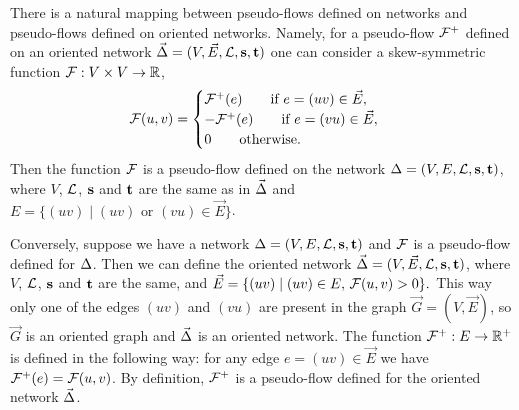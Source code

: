 \documentclass[12pt,oneside,a4paper]{amsart}
\begin{document}
      \begin{remark}
        There is a natural mapping between pseudo-flows defined on networks and pseudo-flows defined on oriented networks.
          Namely, for a pseudo-flow $\mathcal{{F}^{+}}$ defined on an oriented network $\vec{\Delta} = (V, \vec{E}, \mathcal{L}, \mathbf{s}, \mathbf{t})$
          one can consider a skew-symmetric function
          $\mathcal{F}: V \times V \to \mathbb{R}$,
        \begin{align*}
          \mathcal{F}(u, v)=
          \begin{cases}
            \mathcal{{F}^{+}}(e) \qquad \text{if } e = (uv) \in \vec{E},\\
            -\mathcal{{F}^{+}}(e) \qquad \text{if } e = (vu) \in \vec{E}, \\
            0 \qquad \text{otherwise}.
          \end{cases}
        \end{align*}
          Then the function $\mathcal{F}$ is a pseudo-flow defined on the network $\Delta = (V, E, \mathcal{L}, \mathbf{s}, \mathbf{t})$, where $V$, $\mathcal{L}$, $\mathbf{s}$ and $\mathbf{t}$ are the same
          as in $\vec{\Delta}$ and $E = \{(uv) \mid (uv) \text{ or } (vu) \in \vec{E}\}$.

        Conversely, suppose we have a network $\Delta = (V, E, \mathcal{L}, \mathbf{s}, \mathbf{t})$ and $\mathcal{F}$ is a pseudo-flow defined
          for $\Delta$.
        Then we can define the oriented network $\vec{\Delta} = (V, \vec{E}, \mathcal{L}, \mathbf{s}, \mathbf{t})$, where $V$, $\mathcal{L}$, $\mathbf{s}$ and $\mathbf{t}$
          are the same, and $\vec{E} = \{(uv) \mid (uv) \in E, \, \mathcal{F}(u, v) > 0 \}.$
        This way only one of the edges $(uv)$ and $(vu)$ are present in the graph $\vec{G} = (V, \vec{E})$,
          so $\vec{G}$ is an oriented graph and $\vec{\Delta}$ is an oriented network.
        The function $\mathcal{{F}^{+}}: E \to \mathbb{R}^{+}$ is defined in the following way:
          for any edge $e =(uv) \in \vec{E}$ we have $\mathcal{{F}^{+}}(e) = \mathcal{F}(u,v)$.
        By definition, $\mathcal{{F}^{+}}$ is a pseudo-flow defined for the oriented network $\vec{\Delta}$.
      \end{remark}
\end{document}
